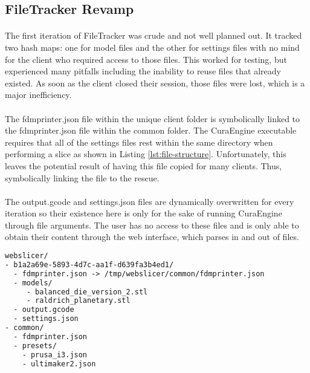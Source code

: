 \subsection{FileTracker Revamp}
\paragraph{}
The first iteration of FileTracker was crude and not well planned out. 
It tracked two hash maps: one for model files and the other for settings files with no mind for the client who required access to those files. 
This worked for testing, but experienced many pitfalls including the inability to reuse files that already existed. 
As soon as the client closed their session, those files were lost, which is a major inefficiency.

\paragraph{}
The fdmprinter.json file within the unique client folder is symbolically linked to the fdmprinter.json file within the common folder. 
The CuraEngine executable requires that all of the settings files rest within the same directory when performing a slice as shown in Listing \ref{lst:file-structure}.
Unfortunately, this leaves the potential result of having this file copied for many clients. 
Thus, symbolically linking the file to the rescue.

\paragraph{}
The output.gcode and settings.json files are dynamically overwritten for every iteration so their existence here is only for the sake of running CuraEngine through file arguments.
The user has no access to these files and is only able to obtain their content through the web interface, which parses in and out of files.

\begin{lstlisting}[language=XML, label={lst:file-structure}, caption=WebSlicer's underlying file structure supported by FileTracker.]
webslicer/
- b1a2a69e-5893-4d7c-aa1f-d639fa3b4ed1/
  - fdmprinter.json -> /tmp/webslicer/common/fdmprinter.json
  - models/
     - balanced_die_version_2.stl
     - raldrich_planetary.stl
  - output.gcode
  - settings.json
- common/
  - fdmprinter.json
  - presets/
    - prusa_i3.json
    - ultimaker2.json
\end{lstlisting}

